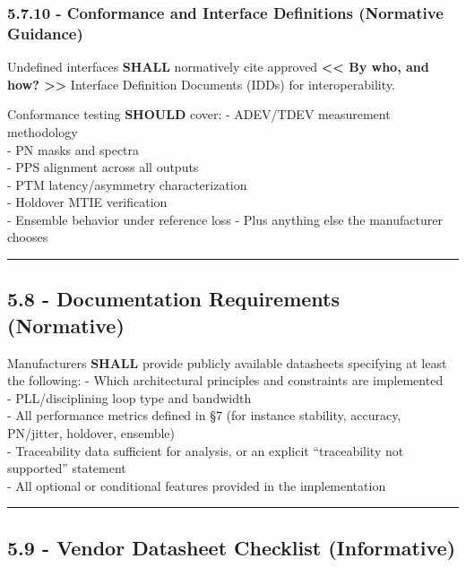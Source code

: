 \subsubsection{5.7.10 - Conformance and Interface Definitions (Normative
Guidance)}\label{conformance-and-interface-definitions-normative-guidance}

Undefined interfaces \textbf{SHALL} normatively cite approved
\textbf{\textless\textless{} By who, and how?
\textgreater\textgreater{}} Interface Definition Documents (IDDs) for
interoperability.

Conformance testing \textbf{SHOULD} cover: - ADEV/TDEV measurement
methodology\\
- PN masks and spectra\\
- PPS alignment across all outputs\\
- PTM latency/asymmetry characterization\\
- Holdover MTIE verification\\
- Ensemble behavior under reference loss - Plus anything else the
manufacturer chooses

\begin{center}\rule{0.5\linewidth}{0.5pt}\end{center}

\subsection{5.8 - Documentation Requirements
(Normative)}\label{documentation-requirements-normative}

Manufacturers \textbf{SHALL} provide publicly available datasheets
specifying at least the following: - Which architectural principles and
constraints are implemented\\
- PLL/disciplining loop type and bandwidth\\
- All performance metrics defined in §7 (for instance stability,
accuracy, PN/jitter, holdover, ensemble)\\
- Traceability data sufficient for analysis, or an explicit
``traceability not supported'' statement\\
- All optional or conditional features provided in the implementation

\begin{center}\rule{0.5\linewidth}{0.5pt}\end{center}

\subsection{5.9 - Vendor Datasheet Checklist
(Informative)}\label{vendor-datasheet-checklist-informative}

